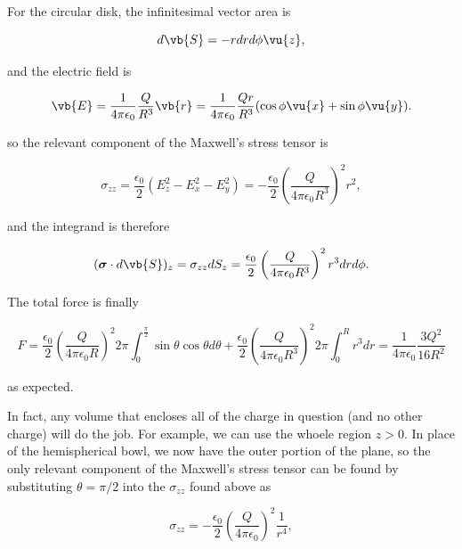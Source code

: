 \documentclass[english,a4paper,12pt]{report}
\begin{document}
{For the circular disk, the infinitesimal vector area is 

\begin{equation}
    d\vb{S} = -r dr d\phi \vu{z} ,
\end{equation}

and the electric field is 

\begin{equation}
    \vb{E} = \frac{1}{4\pi \epsilon_0} \frac{Q}{R^3 }\vb{r} = \frac{1}{4\pi \epsilon_0} \frac{Qr}{R^3 }(\cos \phi \vu{x} + \sin \phi \vu{y} ).  
\end{equation}

so the relevant component of the Maxwell's stress tensor is 

\begin{equation}
    \sigma _{zz} = \frac{\epsilon_0 }{2}\left( E_{z}^2 - E_{x}^2 - E_{y}^2    \right) = - \frac{\epsilon_0 }{2} \left( \frac{Q}{4\pi \epsilon_0 R^3 }  \right)^2r^2,
\end{equation}

and the integrand is therefore

\begin{equation}
    (\boldsymbol{\sigma } \cdot d\vb{S}  )_{z} =  \sigma _{zz}dS_{z} = \frac{\epsilon_0 }{2} \left( \frac{Q}{4\pi \epsilon_0 R^3 }  \right)^2 r^3 dr d\phi .  
\end{equation}

The total force is finally 

\begin{equation}
    F = \frac{\epsilon_0 }{2} \left( \frac{Q}{4\pi \epsilon_0 R}  \right)^2 2\pi \int_{0}^{\frac{\pi }{2} } \sin \theta \cos \theta d \theta + \frac{\epsilon_0 }{2} \left( \frac{Q}{4\pi \epsilon_0 R^3 }  \right)^2 2\pi \int_{0}^{R} r^3 dr = \frac{1}{4\pi \epsilon_0} \frac{3Q^2}{16R^2}
\end{equation}

as expected.

In fact, any volume that encloses all of the charge in question (and no other charge) will do the job. For example, we can use the whoele region \(z > 0\). In place of the hemispherical bowl, we now have the outer portion of the plane, so the only relevant component of the Maxwell's stress tensor can be found by substituting \(\theta = \pi /2\) into the \(\sigma _{zz} \) found above as

\begin{equation}
    \sigma _{zz} = - \frac{\epsilon_0 }{2} \left( \frac{Q}{4\pi \epsilon_0 }  \right)^2 \frac{1}{r^4},    
\end{equation} 

}
\end{document}
